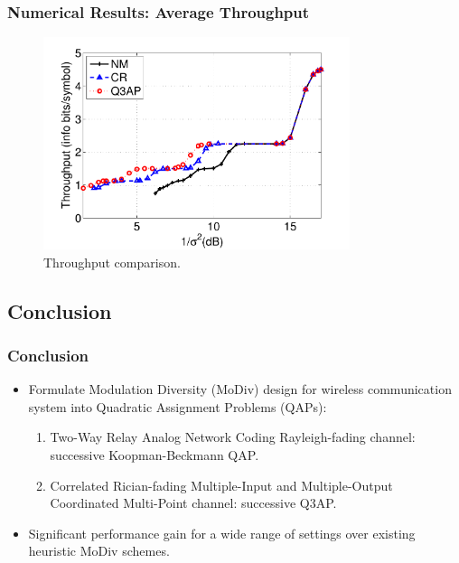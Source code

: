 \documentclass{beamer}
\begin{document}
\begin{frame}
  \frametitle{Numerical Results: Average Throughput}
  \begin{figure}
    \includegraphics[width=0.8\textwidth]{figs/throughput_64QAM_Q3AP.pdf}
    \caption{Throughput comparison.}
  \end{figure}
\end{frame}

\subsection{Conclusion}
\begin{frame}
  \frametitle{Conclusion}
  \begin{itemize}[<+->]
    \item Formulate Modulation Diversity (MoDiv) design for wireless
    communication system into Quadratic Assignment Problems (QAPs):
    \begin{enumerate}
      \item Two-Way Relay Analog Network Coding Rayleigh-fading channel:
      successive Koopman-Beckmann QAP\footnotemark.
      \item Correlated Rician-fading Multiple-Input and Multiple-Output
      Coordinated Multi-Point channel:
      successive Q3AP\footnotemark.
    \end{enumerate}
    \item Significant performance gain for a wide range of settings over
    existing heuristic MoDiv schemes. 
  \end{itemize}
\end{frame}

\end{document}
